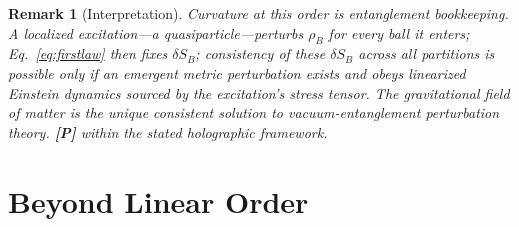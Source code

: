 \documentclass[11pt]{article}
\newtheorem{remark}[theorem]{Remark}
\theoremstyle{definition}
\newcommand{\pP}{\textbf{[P]}}
\begin{document}
\begin{remark}[Interpretation]
Curvature at this order \emph{is} entanglement bookkeeping. A localized
excitation---a quasiparticle---perturbs $\rho_B$ for every ball it enters;
Eq.~\eqref{eq:firstlaw} then fixes $\delta S_B$; consistency of these
$\delta S_B$ across all partitions is possible only if an emergent metric
perturbation exists and obeys linearized Einstein dynamics sourced by the
excitation's stress tensor. The gravitational field of matter is the unique
consistent solution to vacuum-entanglement perturbation theory. \pP{} within
the stated holographic framework.
\end{remark}

\section{Beyond Linear Order}
\end{document}
